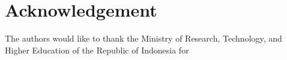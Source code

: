 \section{Acknowledgement}
\label{sec:acknowledgement}

The authors would like to thank the Ministry of Research, Technology, and Higher Education of the Republic of Indonesia for \lipsum[1]